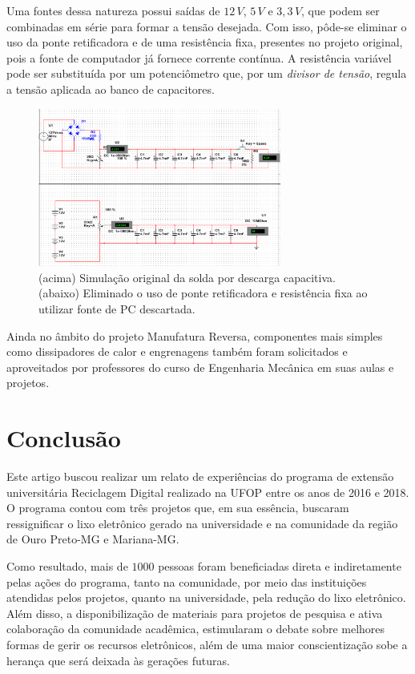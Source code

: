 \documentclass[a4paper]{ifacconf}
\begin{document}
Uma fontes dessa natureza possui saídas de $12\,V$, $5\,V$ e $3,3\,V$, que podem ser combinadas em série para formar a tensão desejada. Com isso, pôde-se eliminar o uso da ponte retificadora e de uma resistência fixa, presentes no projeto original, pois a fonte de computador já fornece corrente contínua. A resistência variável pode ser substituída por um potenciômetro que, por um \textit{divisor de tensão}, regula a tensão aplicada ao banco de capacitores.

\begin{figure}
	\centering
	\includegraphics[width=8cm]{figuras/simulacao3.png}
	\caption{(acima) Simulação original da solda por descarga capacitiva. (abaixo) Eliminado o uso de ponte retificadora e resistência fixa ao utilizar fonte de PC descartada.}  \label{fig:simulacao3} 
\end{figure}

Ainda no âmbito do projeto Manufatura Reversa, componentes mais simples como dissipadores de calor e engrenagens também foram solicitados e aproveitados por professores do curso de Engenharia Mecânica em suas aulas e projetos. 

\section{Conclusão}
Este artigo buscou realizar um relato de experiências do programa de extensão universitária Reciclagem Digital realizado na UFOP entre os anos de 2016 e 2018. O programa contou com três projetos que, em sua essência, buscaram ressignificar o lixo eletrônico gerado na universidade e na comunidade da região de Ouro Preto-MG e Mariana-MG.

Como resultado, mais de $1000$ pessoas foram beneficiadas direta e indiretamente pelas ações do programa, tanto na comunidade, por meio das instituições atendidas pelos projetos, quanto na universidade, pela redução do lixo eletrônico. Além disso, a disponibilização de materiais para projetos de pesquisa e ativa colaboração da comunidade acadêmica, estimularam o debate sobre melhores formas de gerir os recursos eletrônicos, além de uma maior conscientização sobe a herança que será deixada às gerações futuras. 
\end{document}
